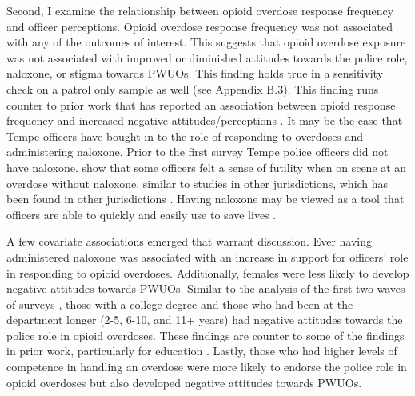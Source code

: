 Second, I examine the relationship between opioid overdose response frequency and officer perceptions. Opioid overdose response frequency was not associated with any of the outcomes of interest. This suggests that opioid overdose exposure was not associated with improved or diminished attitudes towards the police role, naloxone, or stigma towards PWUOs. This finding holds true in a sensitivity check on a patrol only sample as well (see Appendix B.3). This finding runs counter to prior work that has reported an association between opioid response frequency and increased negative attitudes/perceptions \parencite{carroll_knowledge_2020, murphy_police_2020, murphy_police_2021}. It may be the case that Tempe officers have bought in to the role of responding to overdoses and administering naloxone. Prior to the first survey Tempe police officers did not have naloxone. \textcite{white_moving_2021} show that some officers felt a sense of futility when on scene at an overdose without naloxone, similar to studies in other jurisdictions, which has been found in other jurisdictions \parencite{smiley-mcdonald_perspectives_2022}. Having naloxone may be viewed as a tool that officers are able to quickly and easily use to save lives \parencite{lloyd_its_2023}. 

A few covariate associations emerged that warrant discussion. Ever having administered naloxone was associated with an increase in support for officers' role in responding to opioid overdoses. Additionally, females were less likely to develop negative attitudes towards PWUOs. Similar to the analysis of the first two waves of surveys \parencite{white_narcan_2021}, those with a college degree and those who had been at the department longer (2-5, 6-10, and 11+ years) had negative attitudes towards the police role in opioid overdoses. These findings are counter to some of the findings in prior work, particularly for education \parencite{jorgensen_badges_2018}. Lastly, those who had higher levels of competence in handling an overdose were more likely to endorse the police role in opioid overdoses but also developed negative attitudes towards PWUOs. 

